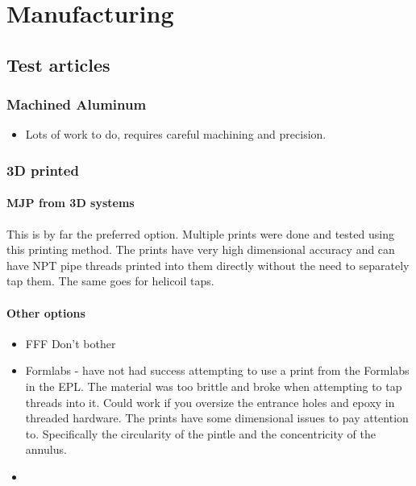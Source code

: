 \documentclass[11pt]{article}
\providecommand{\tightlist}{%
      \setlength{\itemsep}{0pt}\setlength{\parskip}{0pt}}
\begin{document}
    \section{Manufacturing}\label{manufacturing}

\subsection{Test articles}\label{test-articles}

\subsubsection{Machined Aluminum}\label{machined-aluminum}

\begin{itemize}
\tightlist
\item
  Lots of work to do, requires careful machining and precision.
\end{itemize}

\subsubsection{3D printed}\label{d-printed}

\paragraph{MJP from 3D systems}\label{mjp-from-3d-systems}

This is by far the preferred option. Multiple prints were done and
tested using this printing method. The prints have very high dimensional
accuracy and can have NPT pipe threads printed into them directly
without the need to separately tap them. The same goes for helicoil
taps.

\paragraph{Other options}\label{other-options}

\begin{itemize}
\item
  FFF Don't bother
\item
  Formlabs - have not had success attempting to use a print from the
  Formlabs in the EPL. The material was too brittle and broke when
  attempting to tap threads into it. Could work if you oversize the
  entrance holes and epoxy in threaded hardware. The prints have some
  dimensional issues to pay attention to. Specifically the circularity
  of the pintle and the concentricity of the annulus.
\item
\end{itemize}
\end{document}
